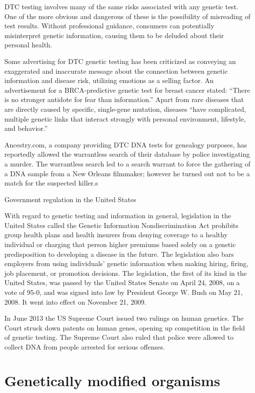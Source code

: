 DTC testing involves many of the same risks associated with any genetic test. One of the more obvious and dangerous of these is the possibility of misreading of test results. Without professional guidance, consumers can potentially misinterpret genetic information, causing them to be deluded about their personal health.

Some advertising for DTC genetic testing has been criticized as conveying an exaggerated and inaccurate message about the connection between genetic information and disease risk, utilizing emotions as a selling factor. An advertisement for a BRCA-predictive genetic test for breast cancer stated: ``There is no stronger antidote for fear than information.'' Apart from rare diseases that are directly caused by specific, single-gene mutation, diseases ``have complicated, multiple genetic links that interact strongly with personal environment, lifestyle, and behavior.''

Ancestry.com, a company providing DTC DNA tests for genealogy purposes, has reportedly allowed the warrantless search of their database by police investigating a murder. The warrantless search led to a search warrant to force the gathering of a DNA sample from a New Orleans filmmaker; however he turned out not to be a match for the suspected killer.s

Government regulation in the United States

With regard to genetic testing and information in general, legislation in the United States called the Genetic Information Nondiscrimination Act prohibits group health plans and health insurers from denying coverage to a healthy individual or charging that person higher premiums based solely on a genetic predisposition to developing a disease in the future. The legislation also bars employers from using individuals' genetic information when making hiring, firing, job placement, or promotion decisions. The legislation, the first of its kind in the United States, was passed by the United States Senate on April 24, 2008, on a vote of 95-0, and was signed into law by President George W. Bush on May 21, 2008. It went into effect on November 21, 2009.

In June 2013 the US Supreme Court issued two rulings on human genetics. The Court struck down patents on human genes, opening up competition in the field of genetic testing. The Supreme Court also ruled that police were allowed to collect DNA from people arrested for serious offenses.

\hypertarget{genetically-modified-organisms}{%
\section{Genetically modified organisms}\label{genetically-modified-organisms}}

